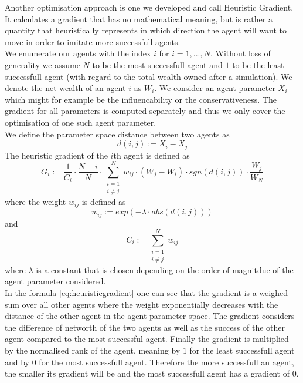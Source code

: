 \documentclass[11pt]{article}
\begin{document}
Another optimisation approach is one we developed and call Heuristic Gradient. It calculates a gradient that has no mathematical meaning, but is rather a quantity that heuristically represents in which direction the agent will want to move in order to imitate more successfull agents. \\
We enumerate our agents with the index $i$ for $i=1,...,N$. Without loss of generality we assume $N$ to be the most successfull agent and $1$ to be the least successfull agent (with regard to the total wealth owned after a simulation). We denote the net wealth of an agent $i$ as $W_i$. We consider an agent parameter $X_i$ which might for example be the influencability or the conservativeness. The gradient for all parameters is computed separately and thus we only cover the optimisation of one such agent parameter. \\
We define the parameter space distance between two agents as
\begin{equation}
  d(i,j):=X_i-X_j
\end{equation}
The heuristic gradient of the $i$th agent is defined as \\
\begin{equation}\label{eq:heuristicgradient}
  G_i:=\frac{1}{C_i}\cdot \frac{N-i}{N} \cdot \sum\limits_{\substack{i=1 \\ i\neq j}}^{N}{ w_{ij} \cdot (W_j - W_i) \cdot sgn(d(i,j)) \cdot \frac{W_j}{W_N} }
\end{equation}
where the weight $w_{ij}$ is defined as
\begin{equation}
  w_{ij}:=exp(-\lambda \cdot abs(d(i,j)))
\end{equation}
and
\begin{equation}
  C_i:=\sum\limits_{\substack{i=1 \\ i\neq j}}^{N}{w_{ij}}
\end{equation}
where $\lambda$ is a constant that is chosen depending on the order of magnitdue of the agent parameter considered. \\
In the formula \ref{eq:heuristicgradient} one can see that the gradient is a weighed sum over all other agents where the weight exponentially decreases with the distance of the other agent in the agent parameter space. The gradient considers the difference of networth of the two agents as well as the success of the other agent compared to the most successful agent. Finally the gradient is multiplied by the normalised rank of the agent, meaning by $1$ for the least successfull agent and by $0$ for the most successfull agent. Therefore the more successfull an agent, the smaller its gradient will be and the most successfull agent has a gradient of $0$. \\
\end{document}
